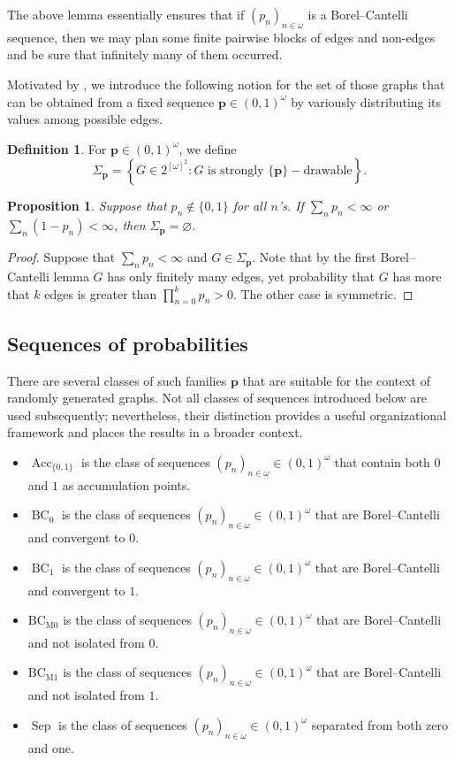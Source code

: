 \documentclass{amsart}
\newtheorem{prop}[theorem]{Proposition}
\theoremstyle{plain}
\theoremstyle{definition}
\newtheorem{df}[theorem]{Definition}
\theoremstyle{remark}
\numberwithin{equation}{section}
\newcommand{\on}{\operatorname}
\DeclareMathOperator{\Acc}{Acc}
\begin{document}
The above lemma essentially ensures that if $(p_n)_{n\in\omega}$ is a Borel--Cantelli sequence, then we may plan some finite pairwise blocks of edges and non-edges and be sure that infinitely many of them occurred.

Motivated by \cite{bergfalk2018ramsey}, we introduce the following notion for the set of those graphs that can be obtained from a fixed sequence $\textbf{p} \in (0,1)^\omega$ by variously distributing its values among possible edges.



\begin{df}
For $\textbf{p} \in (0,1)^\omega$, we define 
$$\Sigma_{\mathbf{p}}= \left\{G\in 2^{[\omega]^2} : G\text{ is strongly } \{\textbf{p}\}-\text{drawable}\right\}.$$
\end{df}
\begin{prop}\label{p:Non-BC}
Suppose that $p_n \notin \{0,1\}$ for all $n$'s. If $\sum\limits_n p_n<\infty$ or $\sum\limits_n \left(1-p_n\right)<\infty$, then $\Sigma_{\mathbf{p}}=\varnothing$.
\end{prop}
\begin{proof}
    Suppose that $\sum\limits_n p_n<\infty$ and $G\in \Sigma_{\mathbf{p}}$. Note that by the first Borel--Cantelli lemma $G$ has only finitely many edges, yet probability that $G$ has more that $k$ edges is greater than $\prod_{n=0}^k p_n>0$. The other case is symmetric.
\end{proof}
\subsection{Sequences of probabilities}

There are several classes of such families $\mathbf{p}$ that are suitable for the context of randomly generated graphs. Not all classes of sequences introduced below are used subsequently; nevertheless, their distinction provides a useful organizational framework and places the results in a broader context.
\begin{itemize}
    \item $\Acc_{\{0,1\}}$ is the class of sequences $(p_n)_{n\in\omega} \in (0,1)^\omega$ that contain both $0$ and $1$ as accumulation points.
    \item $\on{BC}_0$ is the class of sequences $(p_n)_{n\in\omega} \in (0,1)^\omega$ that are Borel--Cantelli and convergent to $0$.
    \item $\on{BC}_1$ is the class of sequences $(p_n)_{n\in\omega} \in (0,1)^\omega$ that are Borel--Cantelli and convergent to $1$.
    \item $\on{BC_{M0}}$ is the class of sequences $(p_n)_{n\in\omega} \in (0,1)^\omega$ that are Borel--Cantelli and not isolated from $0$.
    \item $\on{BC_{M1}}$ is the class of sequences $(p_n)_{n\in\omega} \in (0,1)^\omega$ that are Borel--Cantelli and not isolated from $1$.
    \item $\on{Sep}$  is the class of sequences $(p_n)_{n\in\omega} \in (0,1)^\omega$ separated from both zero and one.
\end{itemize}
\end{document}
